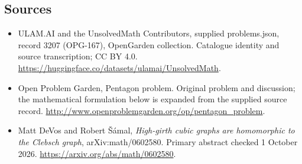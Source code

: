 \documentclass[11pt,a4paper]{article}
\begin{document}
\subsection{Sources}
\begin{itemize}
\item[S1] ULAM.AI and the UnsolvedMath Contributors, supplied problems.json, record 3207 (OPG-167), OpenGarden collection. Catalogue identity and source transcription; CC BY 4.0.
\url{https://huggingface.co/datasets/ulamai/UnsolvedMath}.
\item[S2] Open Problem Garden, Pentagon problem. Original problem and discussion; the mathematical formulation below is expanded from the supplied source record.
\url{http://www.openproblemgarden.org/op/pentagon_problem}.
\item[R1] Matt DeVos and Robert Šámal, \emph{High-girth cubic graphs
are homomorphic to the Clebsch graph}, arXiv:math/0602580.
Primary abstract checked 1 October 2026.
\url{https://arxiv.org/abs/math/0602580}.
\end{itemize}
\end{document}
